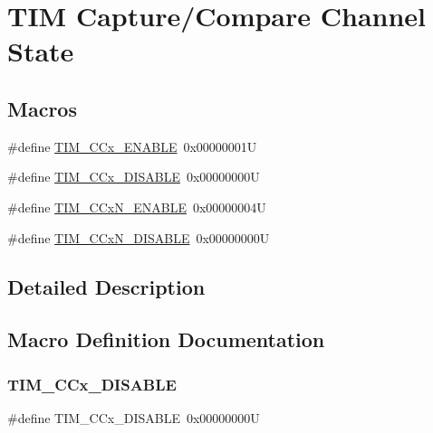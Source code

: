 \hypertarget{group___channel___c_c___state}{}\section{T\+IM Capture/\+Compare Channel State}
\label{group___channel___c_c___state}
\subsection*{Macros}
\begin{DoxyCompactItemize}
\item 
\#define \hyperlink{group___channel___c_c___state_ga7b214df0d5c67138de7bc84e937909f0}{T\+I\+M\+\_\+\+C\+Cx\+\_\+\+E\+N\+A\+B\+LE}~0x00000001U
\item 
\#define \hyperlink{group___channel___c_c___state_ga5068d16e01778cd3bd09555013b2f4d3}{T\+I\+M\+\_\+\+C\+Cx\+\_\+\+D\+I\+S\+A\+B\+LE}~0x00000000U
\item 
\#define \hyperlink{group___channel___c_c___state_ga69ecb0bf5dcd5ecf30af36d6fc00ea0d}{T\+I\+M\+\_\+\+C\+Cx\+N\+\_\+\+E\+N\+A\+B\+LE}~0x00000004U
\item 
\#define \hyperlink{group___channel___c_c___state_ga241183326d83407f7cc7dbd292533240}{T\+I\+M\+\_\+\+C\+Cx\+N\+\_\+\+D\+I\+S\+A\+B\+LE}~0x00000000U
\end{DoxyCompactItemize}


\subsection{Detailed Description}


\subsection{Macro Definition Documentation}
\mbox{\label{group___channel___c_c___state_ga5068d16e01778cd3bd09555013b2f4d3}} 
\subsubsection{\texorpdfstring{T\+I\+M\+\_\+\+C\+Cx\+\_\+\+D\+I\+S\+A\+B\+LE}{TIM\_CCx\_DISABLE}}
{\footnotesize\ttfamily \#define T\+I\+M\+\_\+\+C\+Cx\+\_\+\+D\+I\+S\+A\+B\+LE~0x00000000U}

